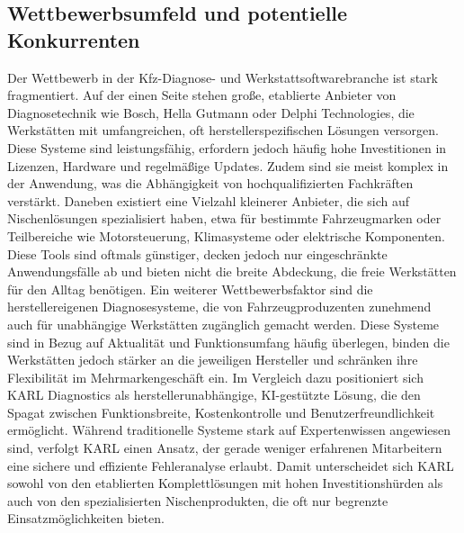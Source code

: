 \subsection{Wettbewerbsumfeld und potentielle Konkurrenten}
Der Wettbewerb in der Kfz-Diagnose- und Werkstattsoftwarebranche ist stark fragmentiert. Auf der einen Seite stehen große, etablierte Anbieter von Diagnosetechnik wie Bosch, Hella Gutmann oder Delphi Technologies, die Werkstätten mit umfangreichen, oft herstellerspezifischen Lösungen versorgen. Diese Systeme sind leistungsfähig, erfordern jedoch häufig hohe Investitionen in Lizenzen, Hardware und regelmäßige Updates. Zudem sind sie meist komplex in der Anwendung, was die Abhängigkeit von hochqualifizierten Fachkräften verstärkt. \citep[vgl.][]{delphi2025dsdiagnosesoftware,bosch2025diagnosegeraete,hellagutmann2025diagnoseloesungen}
\newline\newline
Daneben existiert eine Vielzahl kleinerer Anbieter, die sich auf Nischenlösungen spezialisiert haben, etwa für bestimmte Fahrzeugmarken oder Teilbereiche wie Motorsteuerung, Klimasysteme oder elektrische Komponenten. Diese Tools sind oftmals günstiger, decken jedoch nur eingeschränkte Anwendungsfälle ab und bieten nicht die breite Abdeckung, die freie Werkstätten für den Alltag benötigen. Ein weiterer Wettbewerbsfaktor sind die herstellereigenen Diagnosesysteme, die von Fahrzeugproduzenten zunehmend auch für unabhängige Werkstätten zugänglich gemacht werden. Diese Systeme sind in Bezug auf Aktualität und Funktionsumfang häufig überlegen, binden die Werkstätten jedoch stärker an die jeweiligen Hersteller und schränken ihre Flexibilität im Mehrmarkengeschäft ein.
\newline\newline
Im Vergleich dazu positioniert sich KARL Diagnostics als herstellerunabhängige, \ac{KI}-gestützte Lösung, die den Spagat zwischen Funktionsbreite, Kostenkontrolle und Benutzerfreundlichkeit ermöglicht. Während traditionelle Systeme stark auf Expertenwissen angewiesen sind, verfolgt KARL einen Ansatz, der gerade weniger erfahrenen Mitarbeitern eine sichere und effiziente Fehleranalyse erlaubt. Damit unterscheidet sich KARL sowohl von den etablierten Komplettlösungen mit hohen Investitionshürden als auch von den spezialisierten Nischenprodukten, die oft nur begrenzte Einsatzmöglichkeiten bieten.




